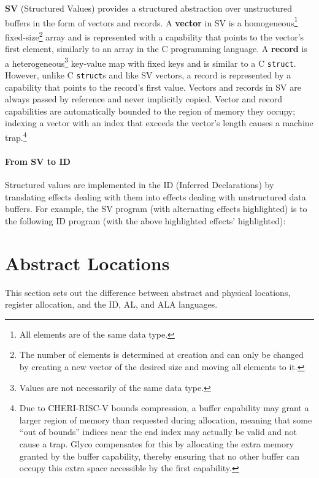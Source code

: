 \documentclass[main.tex]{subfiles}
\begin{document}
\textbf{SV} (Structured Values) provides a structured abstraction over unstructured buffers in the form of vectors and records. A \textbf{vector} in SV is a homogeneous\footnote{All elements are of the same data type.} fixed-size\footnote{The number of elements is determined at creation and can only be changed by creating a new vector of the desired size and moving all elements to it.} array and is represented with a capability that points to the vector's first element, similarly to an array in the C programming language. A \textbf{record} is a heterogeneous\footnote{Values are not necessarily of the same data type.} key-value map with fixed keys and is similar to a C \texttt{struct}. However, unlike C \texttt{struct}s and like SV vectors, a record is represented by a capability that points to the record's first value. Vectors and records in SV are always passed by reference and never implicitly copied. Vector and record capabilities are automatically bounded to the region of memory they occupy; indexing a vector with an index that exceeds the vector's length causes a machine trap.\footnote{Due to CHERI-RISC-V bounds compression, a buffer capability may grant a larger region of memory than requested during allocation, meaning that some \enquote{out of bounds} indices near the end index may actually be valid and not cause a trap. Glyco compensates for this by allocating the extra memory granted by the buffer capability, thereby ensuring that no other buffer can occupy this extra space accessible by the first capability.}

\paragraph{From SV to ID} Structured values are implemented in the  ID (Inferred Declarations) by translating effects dealing with them into effects dealing with unstructured data buffers. For example, the SV program (with alternating effects highlighted)
is \lowered{} to the following ID program (with the above highlighted effects'  highlighted):

\section{Abstract Locations} \label{sct:id}

This section sets out the difference between abstract and physical locations, register allocation, and the ID, AL, and ALA languages.
\end{document}
